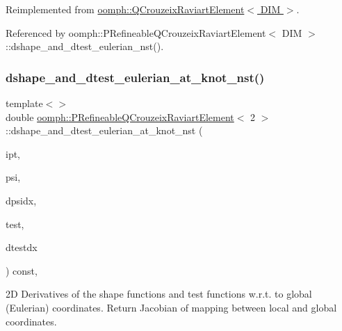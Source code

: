 Reimplemented from \hyperlink{classoomph_1_1QCrouzeixRaviartElement_a3c4261300b81aae3ac358198b3e11906}{oomph\+::\+Q\+Crouzeix\+Raviart\+Element$<$ D\+I\+M $>$}.



Referenced by oomph\+::\+P\+Refineable\+Q\+Crouzeix\+Raviart\+Element$<$ D\+I\+M $>$\+::dshape\+\_\+and\+\_\+dtest\+\_\+eulerian\+\_\+nst().

\mbox{\label{classoomph_1_1PRefineableQCrouzeixRaviartElement_a1537fd64ea853532de2f09b48b0d1db8}} 
\subsubsection{\texorpdfstring{dshape\+\_\+and\+\_\+dtest\+\_\+eulerian\+\_\+at\+\_\+knot\+\_\+nst()}{dshape\_and\_dtest\_eulerian\_at\_knot\_nst()}\hspace{0.1cm}{\footnotesize\ttfamily [2/3]}}
{\footnotesize\ttfamily template$<$$>$ \\
double \hyperlink{classoomph_1_1PRefineableQCrouzeixRaviartElement}{oomph\+::\+P\+Refineable\+Q\+Crouzeix\+Raviart\+Element}$<$ 2 $>$\+::dshape\+\_\+and\+\_\+dtest\+\_\+eulerian\+\_\+at\+\_\+knot\+\_\+nst (\begin{DoxyParamCaption}\item[{const unsigned \&}]{ipt,  }\item[{\hyperlink{classoomph_1_1Shape}{Shape} \&}]{psi,  }\item[{\hyperlink{classoomph_1_1DShape}{D\+Shape} \&}]{dpsidx,  }\item[{\hyperlink{classoomph_1_1Shape}{Shape} \&}]{test,  }\item[{\hyperlink{classoomph_1_1DShape}{D\+Shape} \&}]{dtestdx }\end{DoxyParamCaption}) const\hspace{0.3cm}{\ttfamily [inline]}, {\ttfamily [virtual]}}

2D Derivatives of the shape functions and test functions w.\+r.\+t. to global (Eulerian) coordinates. Return Jacobian of mapping between local and global coordinates. 

